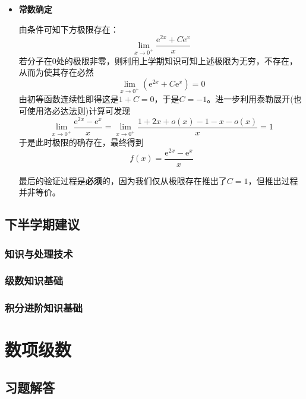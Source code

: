 \documentclass[a4paper,UTF8,fontset=windows,AutoFakeBold]{ctexart}
\newcommand*{\er}{\mathrm{e}}
\newcommand*{\note}{\noindent *}
\theoremstyle{ex}
\begin{document}
\begin{enumerate}
\begin{enumerate}[(1)]
\begin{itemize}
            \item \textbf{常数确定}

            由条件可知下方极限存在：
            $$\lim_{x\to0^+}\frac{\er^{2x}+C\er^x}{x}$$
            若分子在0处的极限非零，则利用上学期知识可知上述极限为无穷，不存在，从而为使其存在必然
            $$\lim_{x\to0^+}(\er^{2x}+C\er^x)=0$$
            由初等函数连续性即得这是$1+C=0$，于是$C=-1$。进一步利用泰勒展开(也可使用洛必达法则)计算可发现
            $$\lim_{x\to0^+}\frac{\er^{2x}-\er^x}{x}=\lim_{x\to0^+}\frac{1+2x+o(x)-1-x-o(x)}{x}=1$$
            于是此时极限的确存在，最终得到
            $$f(x)=\frac{\er^{2x}-\er^x}{x}$$

            \note 最后的验证过程是\textbf{必须}的，因为我们仅从极限存在推出了$C=1$，但推出过程并非等价。
        \end{itemize}
    \end{enumerate}
\end{enumerate}

\subsection{下半学期建议}
\subsubsection{知识与处理技术}

\subsubsection{级数知识基础}

\subsubsection{积分进阶知识基础}

\newpage
\section{数项级数}
\subsection{习题解答}
\end{document}
